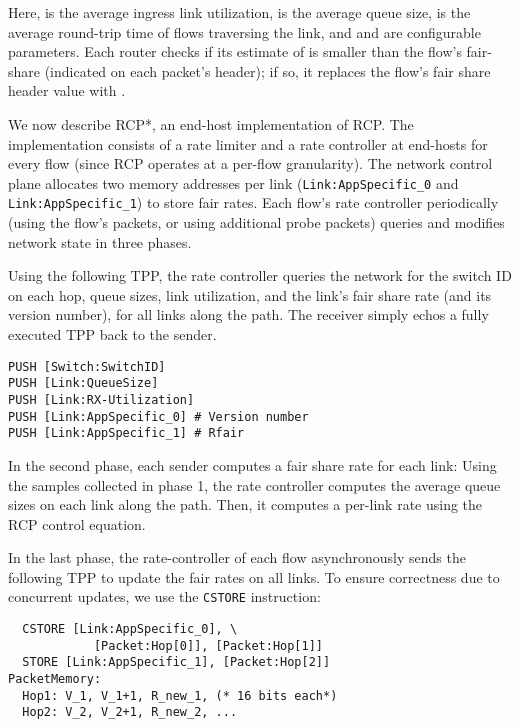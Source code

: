 Here,  is the average ingress link utilization,  is the
average queue size,  is the average round-trip time of flows
traversing the link, and  and  are configurable parameters.
Each router checks if its estimate of  is smaller than the
flow's fair-share (indicated on each packet's header); if so, it
replaces the flow's fair share header value with .

We now describe RCP*, an end-host implementation of RCP\@.  The
implementation consists of a rate limiter and a rate controller at
end-hosts for every flow (since RCP operates at a per-flow
granularity).  The network control plane allocates two memory
addresses per link ({\tt Link:AppSpecific\_0} and {\tt
Link:AppSpecific\_1}) to store fair rates.  Each flow's rate
controller periodically (using the flow's packets, or using additional
probe packets) queries and modifies network state in three phases.

  Using the following TPP, the rate
controller queries the network for the switch ID on each hop, queue
sizes, link utilization, and the link's fair share rate (and its
version number), for all links along the path.  The receiver simply
echos a fully executed TPP back to the sender.  

\begin{verbatim}
PUSH [Switch:SwitchID]
PUSH [Link:QueueSize]
PUSH [Link:RX-Utilization]
PUSH [Link:AppSpecific_0] # Version number
PUSH [Link:AppSpecific_1] # Rfair
\end{verbatim}
  In the second phase, each sender
computes a fair share rate  for each link: Using the
samples collected in phase 1, the rate controller computes the average
queue sizes on each link along the path.  Then, it computes a per-link
rate  using the RCP control equation.

  In the last phase, the
rate-controller of each flow asynchronously sends the following TPP to
update the fair rates on all links.  To ensure correctness due to
concurrent updates, we use the {\tt CSTORE} instruction:

\begin{verbatim}
  CSTORE [Link:AppSpecific_0], \
            [Packet:Hop[0]], [Packet:Hop[1]]
  STORE [Link:AppSpecific_1], [Packet:Hop[2]]
PacketMemory:
  Hop1: V_1, V_1+1, R_new_1, (* 16 bits each*)
  Hop2: V_2, V_2+1, R_new_2, ...
\end{verbatim}

